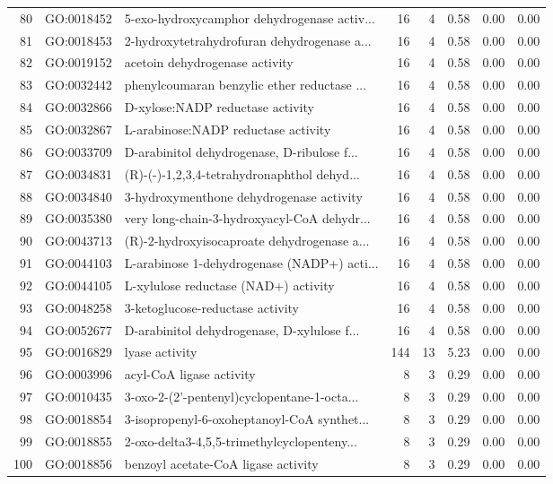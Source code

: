 \begin{table}[ht]
\begin{tabular}{rllrrrrr}
  80 & GO:0018452 & 5-exo-hydroxycamphor dehydrogenase activ... &  16 &   4 & 0.58 & 0.00 & 0.00 \\ 
  81 & GO:0018453 & 2-hydroxytetrahydrofuran dehydrogenase a... &  16 &   4 & 0.58 & 0.00 & 0.00 \\ 
  82 & GO:0019152 & acetoin dehydrogenase activity &  16 &   4 & 0.58 & 0.00 & 0.00 \\ 
  83 & GO:0032442 & phenylcoumaran benzylic ether reductase ... &  16 &   4 & 0.58 & 0.00 & 0.00 \\ 
  84 & GO:0032866 & D-xylose:NADP reductase activity &  16 &   4 & 0.58 & 0.00 & 0.00 \\ 
  85 & GO:0032867 & L-arabinose:NADP reductase activity &  16 &   4 & 0.58 & 0.00 & 0.00 \\ 
  86 & GO:0033709 & D-arabinitol dehydrogenase, D-ribulose f... &  16 &   4 & 0.58 & 0.00 & 0.00 \\ 
  87 & GO:0034831 & (R)-(-)-1,2,3,4-tetrahydronaphthol dehyd... &  16 &   4 & 0.58 & 0.00 & 0.00 \\ 
  88 & GO:0034840 & 3-hydroxymenthone dehydrogenase activity &  16 &   4 & 0.58 & 0.00 & 0.00 \\ 
  89 & GO:0035380 & very long-chain-3-hydroxyacyl-CoA dehydr... &  16 &   4 & 0.58 & 0.00 & 0.00 \\ 
  90 & GO:0043713 & (R)-2-hydroxyisocaproate dehydrogenase a... &  16 &   4 & 0.58 & 0.00 & 0.00 \\ 
  91 & GO:0044103 & L-arabinose 1-dehydrogenase (NADP+) acti... &  16 &   4 & 0.58 & 0.00 & 0.00 \\ 
  92 & GO:0044105 & L-xylulose reductase (NAD+) activity &  16 &   4 & 0.58 & 0.00 & 0.00 \\ 
  93 & GO:0048258 & 3-ketoglucose-reductase activity &  16 &   4 & 0.58 & 0.00 & 0.00 \\ 
  94 & GO:0052677 & D-arabinitol dehydrogenase, D-xylulose f... &  16 &   4 & 0.58 & 0.00 & 0.00 \\ 
  95 & GO:0016829 & lyase activity & 144 &  13 & 5.23 & 0.00 & 0.00 \\ 
  96 & GO:0003996 & acyl-CoA ligase activity &   8 &   3 & 0.29 & 0.00 & 0.00 \\ 
  97 & GO:0010435 & 3-oxo-2-(2'-pentenyl)cyclopentane-1-octa... &   8 &   3 & 0.29 & 0.00 & 0.00 \\ 
  98 & GO:0018854 & 3-isopropenyl-6-oxoheptanoyl-CoA synthet... &   8 &   3 & 0.29 & 0.00 & 0.00 \\ 
  99 & GO:0018855 & 2-oxo-delta3-4,5,5-trimethylcyclopenteny... &   8 &   3 & 0.29 & 0.00 & 0.00 \\ 
  100 & GO:0018856 & benzoyl acetate-CoA ligase activity &   8 &   3 & 0.29 & 0.00 & 0.00 \\ 
   \hline
\end{tabular}
\end{table}
